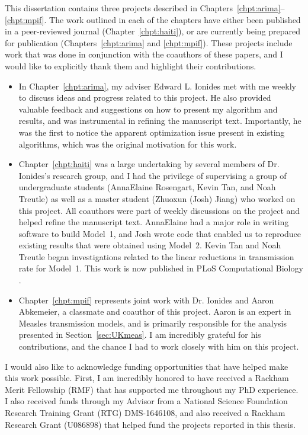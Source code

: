 This dissertation contains three projects described in Chapters~\ref{chpt:arima}--\ref{chpt:mpif}.
The work outlined in each of the chapters have either been published in a peer-reviewed journal (Chapter~\ref{chpt:haiti}), or are currently being prepared for publication (Chapters~\ref{chpt:arima} and \ref{chpt:mpif}). 
These projects include work that was done in conjunction with the coauthors of these papers, and I would like to explicitly thank them and highlight their contributions.
\begin{itemize}
  \item  In Chapter~\ref{chpt:arima}, my adviser Edward L. Ionides met with me weekly to discuss ideas and progress related to this project.
  He also provided valuable feedback and suggestions on how to present my algorithm and results, and was instrumental in refining the manuscript text. 
  Importantly, he was the first to notice the apparent optimization issue present in existing algorithms, which was the original motivation for this work.
  \item Chapter~\ref{chpt:haiti} was a large undertaking by several members of Dr. Ionides's research group, and I had the privilege of supervising a group of undergraduate students (AnnaElaine Rosengart, Kevin Tan, and Noah Treutle) as well as a master student (Zhuoxun (Josh) Jiang) who worked on this project. 
  All coauthors were part of weekly discussions on the project and helped refine the manuscript text.
  AnnaElaine had a major role in writing software to build Model~1, and Josh wrote code that enabled us to reproduce existing results that were obtained using Model~2.
  Kevin Tan and Noah Treutle began investigations related to the linear reductions in transmission rate for Model~1.
  This work is now published in PLoS Computational Biology \citep{wheeler24}. 
  \item Chapter~\ref{chpt:mpif} represents joint work with Dr. Ionides and Aaron Abkemeier, a classmate and coauthor of this project. 
  Aaron is an expert in Measles transmission models, and is primarily responsible for the analysis presented in Section~\ref{sec:UKmeas}.
  I am incredibly grateful for his contributions, and the chance I had to work closely with him on this project.
\end{itemize}

I would also like to acknowledge funding opportunities that have helped make this work possible.
First, I am incredibly honored to have received a Rackham Merit Fellowship (RMF) that has supported me throughout my PhD experience.
I also received funds through my Advisor from a National Science Foundation Research Training Grant (RTG) DMS-1646108, and also received a Rackham Research Grant (U086898) that helped fund the projects reported in this thesis.
